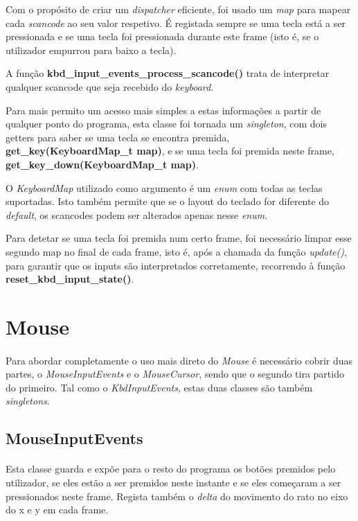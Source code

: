 \documentclass{report}
\begin{document}
Com o propósito de criar um \textit{dispatcher} eficiente, foi usado um \textit{map} para mapear cada \textit{scancode} ao seu valor respetivo. É registada sempre se uma tecla está a ser pressionada e se uma tecla foi pressionada durante este frame (isto é, se o utilizador empurrou para baixo a tecla).

A função \textbf{kbd\_input\_events\_process\_scancode()} trata de interpretar qualquer scancode que seja recebido do \textit{keyboard}.

Para mais permito um acesso mais simples a estas informações a partir de qualquer ponto do programa, esta classe foi tornada um \textit{singleton}, com dois getters para saber se uma tecla se encontra premida, \textbf{get\_key(KeyboardMap\_t map)}, e se uma tecla foi premida neste frame, \textbf{get\_key\_down(KeyboardMap\_t map)}.

O \textit{KeyboardMap} utilizado como argumento é um \textit{enum} com todas as teclas suportadas. Isto também permite que se o layout do teclado for diferente do \textit{default}, os scancodes podem ser alterados apenas nesse \textit{enum}.

Para detetar se uma tecla foi premida num certo frame, foi necessário limpar esse segundo map no final de cada frame, isto é, após a chamada da função \textit{update()}, para garantir que os inputs são interpretados corretamente, recorrendo à função \textbf{reset\_kbd\_input\_state()}.

\section{Mouse}

\paragraph{}
Para abordar completamente o uso mais direto do \textit{Mouse} é necessário cobrir duas partes, o \textit{MouseInputEvents} e o \textit{MouseCursor}, sendo que o segundo tira partido do primeiro.
Tal como o \textit{KbdInputEvents}, estas duas classes são também \textit{singletons}.

\subsection{MouseInputEvents}

\paragraph{}
Esta classe guarda e expõe para o resto do programa os botões premidos pelo utilizador, se eles estão a ser premidos neste instante e se eles começaram a ser pressionados neste frame. Regista também o \textit{delta} do movimento do rato no eixo do x e y em cada frame.
\end{document}
